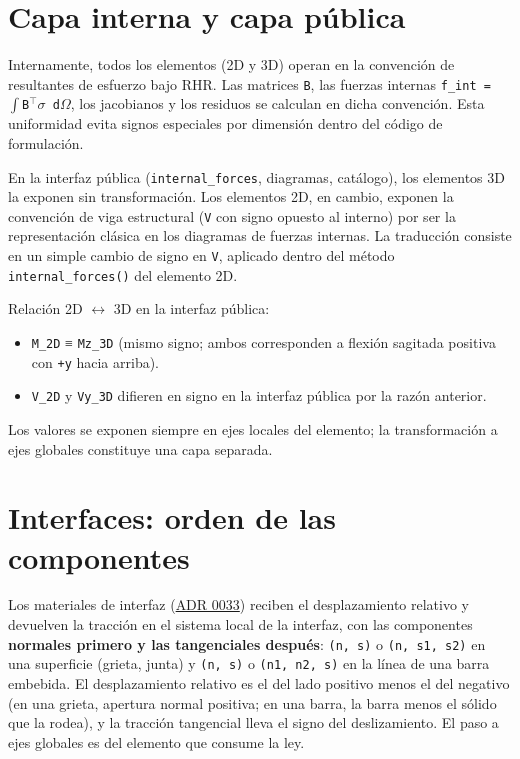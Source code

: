 \documentclass[11pt,oneside]{report}
\begin{document}
\section{Capa interna y capa pública}

Internamente, todos los elementos (2D y 3D) operan en la convención de resultantes de esfuerzo bajo RHR. Las matrices \texttt{B}, las fuerzas internas \texttt{f\_int = \ensuremath{\int}B\ensuremath{^{\top}}\ensuremath{\sigma} d\ensuremath{\Omega}}, los jacobianos y los residuos se calculan en dicha convención. Esta uniformidad evita signos especiales por dimensión dentro del código de formulación.

En la interfaz pública (\texttt{internal\_forces}, diagramas, catálogo), los elementos 3D la exponen sin transformación. Los elementos 2D, en cambio, exponen la convención de viga estructural (\texttt{V} con signo opuesto al interno) por ser la representación clásica en los diagramas de fuerzas internas. La traducción consiste en un simple cambio de signo en \texttt{V}, aplicado dentro del método \texttt{internal\_\allowbreak{}forces()} del elemento 2D.

Relación 2D \ensuremath{\leftrightarrow} 3D en la interfaz pública:

\begin{itemize}
  \item \texttt{M\_2D} ≡ \texttt{Mz\_3D} (mismo signo; ambos corresponden a flexión sagitada positiva con \texttt{+y} hacia arriba).
  \item \texttt{V\_2D} y \texttt{Vy\_3D} difieren en signo en la interfaz pública por la razón anterior.
\end{itemize}

Los valores se exponen siempre en ejes locales del elemento; la transformación a ejes globales constituye una capa separada.

\section{Interfaces: orden de las componentes}

Los materiales de interfaz (\hyperref[adr:0033]{ADR 0033}) reciben el desplazamiento relativo y devuelven la tracción en el sistema local de la interfaz, con las componentes \textbf{normales primero y las tangenciales después}: \texttt{(n, s)} o \texttt{(n, s1, s2)} en una superficie (grieta, junta) y \texttt{(n, s)} o \texttt{(n1, n2, s)} en la línea de una barra embebida. El desplazamiento relativo es el del lado positivo menos el del negativo (en una grieta, apertura normal positiva; en una barra, la barra menos el sólido que la rodea), y la tracción tangencial lleva el signo del deslizamiento. El paso a ejes globales es del elemento que consume la ley.
\end{document}
